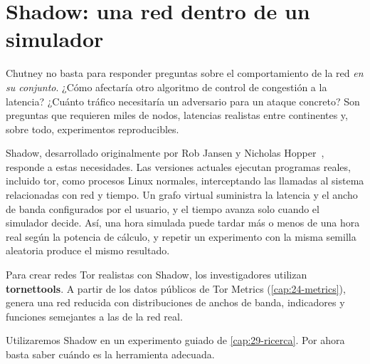 \section{Shadow: una red dentro de un simulador}\label{sec:rp-shadow}

Chutney no basta para responder preguntas sobre el comportamiento de la red \emph{en su conjunto}. ¿Cómo afectaría otro algoritmo de control de congestión a la latencia? ¿Cuánto tráfico necesitaría un adversario para un ataque concreto? Son preguntas que requieren miles de nodos, latencias realistas entre continentes y, sobre todo, experimentos reproducibles.

Shadow, desarrollado originalmente por Rob Jansen y Nicholas Hopper~\cite{jansen2012shadow}, responde a estas necesidades. Las versiones actuales ejecutan programas reales, incluido tor, como procesos Linux normales, interceptando las llamadas al sistema relacionadas con red y tiempo. Un grafo virtual suministra la latencia y el ancho de banda configurados por el usuario, y el tiempo avanza solo cuando el simulador decide. Así, una hora simulada puede tardar más o menos de una hora real según la potencia de cálculo, y repetir un experimento con la misma semilla aleatoria produce el mismo resultado.

Para crear redes Tor realistas con Shadow, los investigadores utilizan \textbf{tornettools}. A partir de los datos públicos de Tor Metrics (\cref{cap:24-metrics}), genera una red reducida con distribuciones de anchos de banda, indicadores y funciones semejantes a las de la red real.

Utilizaremos Shadow en un experimento guiado de \cref{cap:29-ricerca}. Por ahora basta saber cuándo es la herramienta adecuada.

